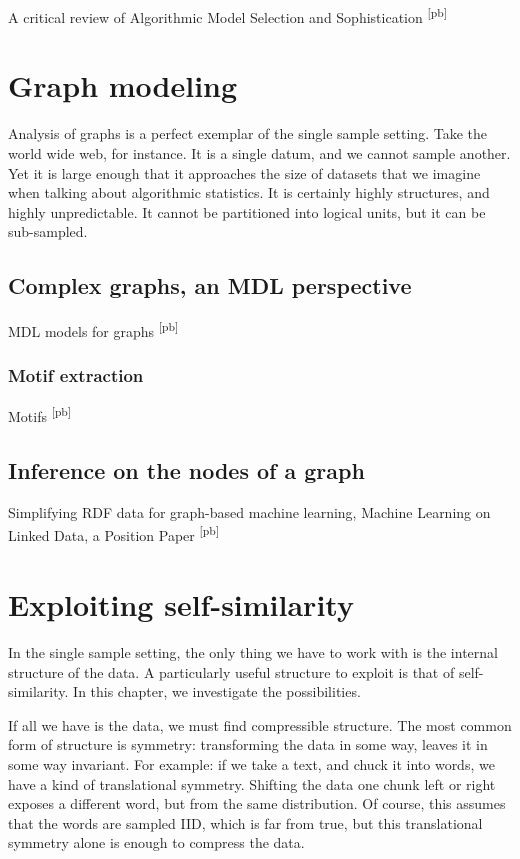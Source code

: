 \documentclass{thesis}
\newcommand{\pb}[1]{\textcolor{OliveGreen}{\small #1 \textsuperscript{[pb]} }}
\begin{document}
\pb{A critical review of Algorithmic Model Selection and Sophistication}

\chapter{Graph modeling}

\begin{summary} Analysis of graphs is a perfect exemplar of the single sample setting. Take the world wide web, for instance. It is a single datum, and we cannot sample another. Yet it is large enough that it approaches the size of datasets that we imagine when talking about algorithmic statistics. It is certainly highly structures, and highly unpredictable. It cannot be partitioned into logical units, but it can be sub-sampled. 
\end{summary}

\section{Complex graphs, an MDL perspective}
\pb{MDL models for graphs}


\subsection{Motif extraction}

\pb{Motifs}

\section{Inference on the nodes of a graph}

\pb{Simplifying RDF data for graph-based machine learning, Machine Learning on Linked Data, a Position Paper}

\chapter{Exploiting self-similarity}
\begin{summary}
In the single sample setting, the only thing we have to work with is the internal structure of the data. A particularly useful structure to exploit is that of self-similarity. In this chapter, we investigate the possibilities. 
\end{summary}

If all we have is the data, we must find compressible structure. The most common form of structure is symmetry: transforming the data in some way, leaves it in some way invariant. For example: if we take a text, and chuck it into words, we have a kind of translational symmetry. Shifting the data one chunk left or right exposes a different word, but from the same distribution. Of course, this assumes that the words are sampled IID, which is far from true, but this translational symmetry alone is enough to compress the data.
\end{document}
